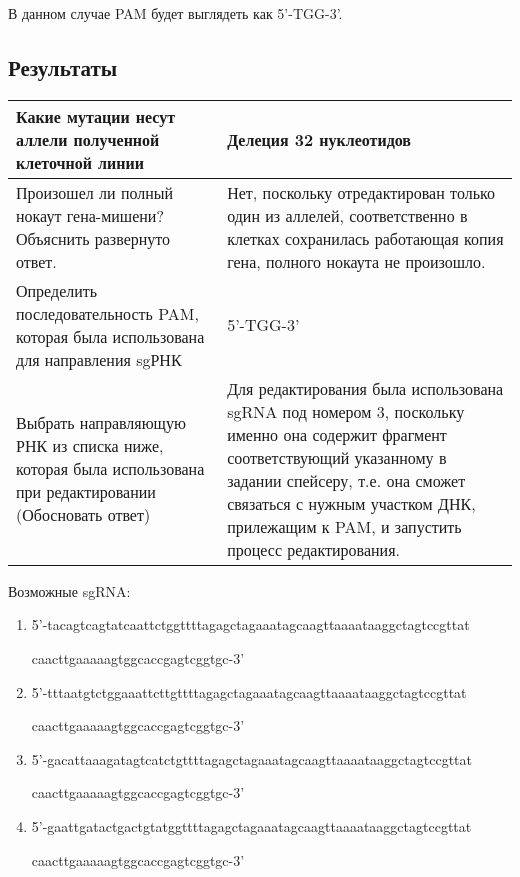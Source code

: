 
В данном случае PAM будет выглядеть как 5’-TGG-3’.

\subsection*{Результаты}

\begin{tabular}{|p{6cm}|p{8cm}|}
    \hline
    Какие мутации несут аллели полученной клеточной линии & Делеция 32 нуклеотидов \\
    \hline
    Произошел ли полный нокаут гена-мишени?
    Объяснить развернуто ответ.	& Нет, поскольку отредактирован только один из аллелей, соответственно в клетках сохранилась работающая копия гена, полного нокаута не произошло. \\
    \hline
    Определить последовательность PAM, которая была использована для направления sgРНК & 5’-TGG-3’ \\
    \hline
    Выбрать направляющую РНК из списка ниже, которая была использована при редактировании
    (Обосновать ответ) & Для редактирования была использована sgRNA под номером 3, поскольку именно она содержит фрагмент соответствующий  указанному в задании спейсеру, т.е. она сможет связаться с нужным участком ДНК, прилежащим к PAM, и запустить процесс редактирования. \\
    \hline
\end{tabular}

Возможные sgRNA:
\begin{enumerate}
\item 5'-tacagtcagtatcaattctggttttagagctagaaatagcaagttaaaataaggctagtccgttat

caacttgaaaaagtggcaccgagtcggtgc-3'
\item 5'-tttaatgtctggaaattcttgttttagagctagaaatagcaagttaaaataaggctagtccgttat

caacttgaaaaagtggcaccgagtcggtgc-3'
\item 5'-gacattaaagatagtcatctgttttagagctagaaatagcaagttaaaataaggctagtccgttat

caacttgaaaaagtggcaccgagtcggtgc-3'
\item 5'-gaattgatactgactgtatggttttagagctagaaatagcaagttaaaataaggctagtccgttat

caacttgaaaaagtggcaccgagtcggtgc-3'
\end{enumerate}

\markSection

